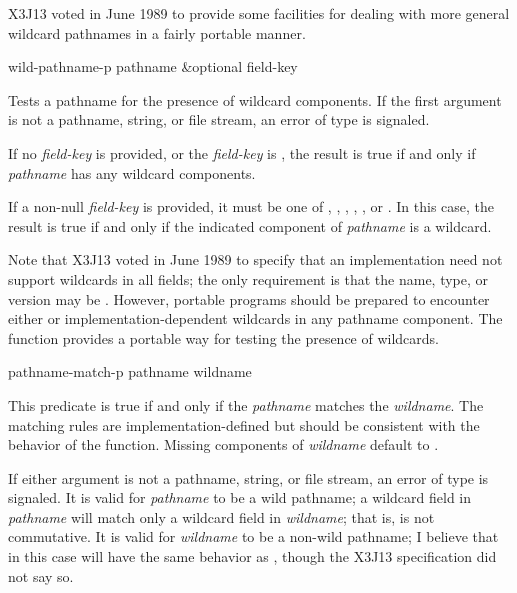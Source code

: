 X3J13 voted in June 1989  to provide
some facilities for dealing with more general wildcard pathnames
in a fairly portable manner.

\begin{defun}[Function]
wild-pathname-p pathname &optional field-key
  
Tests a pathname for the presence of wildcard components.  If the first argument
is not a pathname, string, or file stream, an error of type  is
signaled.
  
If no \emph{field-key} is provided, or the \emph{field-key} is , the
result is true if and only if \emph{pathname} has any wildcard components.

If a non-null \emph{field-key} is provided, it must be one of ,
, , , , or .  In
this case, the result is true if and only if the indicated component of
\emph{pathname} is a wildcard.

Note that X3J13 voted in June 1989  to specify
that an implementation need not support wildcards in all fields; the only
requirement is that the name, type, or version may be .  However,
portable programs should be prepared to encounter either  or
implementation-dependent wildcards in any pathname component.  The function
 provides a portable way for testing the presence of
wildcards.
\end{defun}

\begin{defun}[Function]
pathname-match-p pathname wildname

This predicate is true if and only if the \emph{pathname} matches the
\emph{wildname}.  The matching rules are implementation-defined but should be
consistent with the behavior of the  function.  Missing
components of \emph{wildname} default to .

If either argument is not a pathname, string, or file stream, an error of type
 is signaled.  It is valid for \emph{pathname} to be a wild
pathname; a wildcard field in \emph{pathname} will match only a wildcard field
in \emph{wildname}; that is,  is not commutative.  It is
valid for \emph{wildname} to be a non-wild pathname; I believe that in this case
 will have the same behavior as , though the
X3J13 specification did not say so.
\end{defun}

